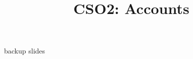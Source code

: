\date{}
\title{CSO2: Accounts}
\date{}

\begin{frame}
    \titlepage
\end{frame}





\begin{frame}{backup slides}
\end{frame}




